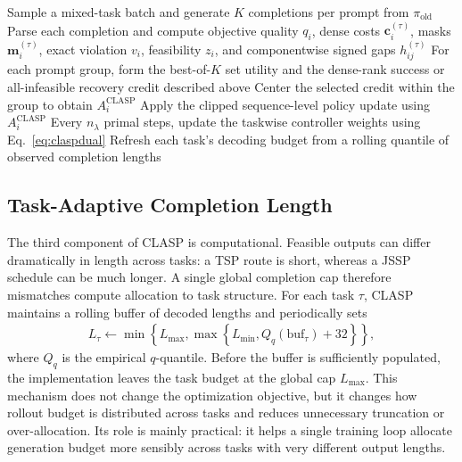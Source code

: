 \documentclass{article}
\theoremstyle{remark}
\begin{document}
\begin{algorithm}[t]
\caption{One CLASP-GRPO training step.}
\label{alg:claspgrpo}
\small
{}
Sample a mixed-task batch and generate \(K\) completions per prompt from \(\pi_{\mathrm{old}}\)\;
Parse each completion and compute objective quality \(q_i\), dense costs \(\mathbf{c}_i^{(\tau)}\), masks \(\mathbf{m}_i^{(\tau)}\), exact violation \(v_i\), feasibility \(z_i\), and componentwise signed gaps \(h_{ij}^{(\tau)}\)\;
For each prompt group, form the best-of-\(K\) set utility and the dense-rank success or all-infeasible recovery credit described above\;
Center the selected credit within the group to obtain \(A_i^{\mathrm{CLASP}}\)\;
Apply the clipped sequence-level policy update using \(A_i^{\mathrm{CLASP}}\)\;
Every \(n_\lambda\) primal steps, update the taskwise controller weights using Eq.~\eqref{eq:claspdual}\;
Refresh each task's decoding budget from a rolling quantile of observed completion lengths\;
\end{algorithm}

\subsection{Task-Adaptive Completion Length}
The third component of CLASP is computational. Feasible outputs can differ dramatically in length across tasks: a TSP route is short, whereas a JSSP schedule can be much longer. A single global completion cap therefore mismatches compute allocation to task structure. For each task \(\tau\), CLASP maintains a rolling buffer of decoded lengths and periodically sets
\begin{align}
L_\tau \leftarrow \min\!\left\{L_{\max},\max\!\left\{L_{\min},Q_q(\mathrm{buf}_\tau)+32\right\}\right\},
\label{eq:adaptivelen}
\end{align}
where \(Q_q\) is the empirical \(q\)-quantile. Before the buffer is sufficiently populated, the implementation leaves the task budget at the global cap \(L_{\max}\). This mechanism does not change the optimization objective, but it changes how rollout budget is distributed across tasks and reduces unnecessary truncation or over-allocation.
Its role is mainly practical: it helps a single training loop allocate generation budget more sensibly across tasks with very different output lengths.
\end{document}
